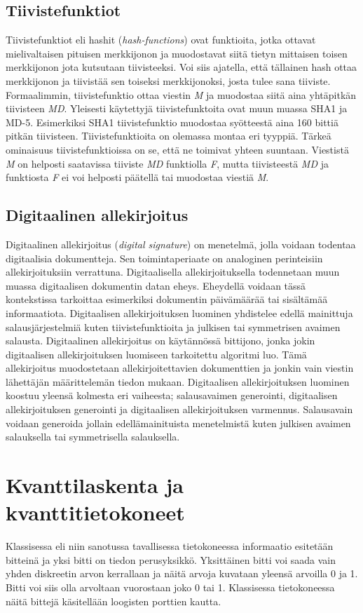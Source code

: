  \subsection{Tiivistefunktiot}
 Tiivistefunktiot eli hashit (\emph{hash-functions}) ovat funktioita, jotka ottavat mielivaltaisen pituisen merkkijonon ja muodostavat siitä tietyn mittaisen toisen merkkijonon jota kutsutaan tiivisteeksi. Voi siis ajatella, että tällainen hash ottaa merkkijonon ja tiivistää sen toiseksi merkkijonoksi, josta tulee sana tiiviste. Formaalimmin, tiivistefunktio ottaa viestin \emph{M} ja muodostaa siitä aina yhtäpitkän tiivisteen \emph{MD}. Yleisesti käytettyjä tiivistefunktoita ovat muun muassa SHA1 ja MD-5. Esimerkiksi SHA1 tiivistefunktio muodostaa syötteestä aina 160 bittiä pitkän tiivisteen. Tiivistefunktioita on olemassa montaa eri tyyppiä. Tärkeä ominaisuus tiivistefunktioissa on se, että ne toimivat yhteen suuntaan. Viestistä \emph{M} on helposti saatavissa tiiviste \emph{MD} funktiolla \emph{F}, mutta tiivisteestä \emph{MD} ja funktiosta \emph{F} ei voi helposti päätellä tai muodostaa viestiä \emph{M}.
 
 \subsection{Digitaalinen allekirjoitus}
 Digitaalinen allekirjoitus (\emph{digital signature}) on menetelmä, jolla voidaan todentaa digitaalisia dokumentteja. Sen toimintaperiaate on analoginen perinteisiin allekirjoituksiin verrattuna. Digitaalisella allekirjoituksella todennetaan muun muassa digitaalisen dokumentin datan eheys. Eheydellä voidaan tässä kontekstissa tarkoittaa esimerkiksi dokumentin päivämäärää tai sisältämää informaatiota. Digitaalisen allekirjoituksen luominen yhdistelee edellä mainittuja salausjärjestelmiä kuten tiivistefunktioita ja julkisen tai symmetrisen avaimen salausta. Digitaalinen allekirjoitus on käytännössä bittijono, jonka jokin digitaalisen allekirjoituksen luomiseen tarkoitettu algoritmi luo. Tämä allekirjoitus muodostetaan allekirjoitettavien dokumenttien ja jonkin vain viestin lähettäjän määrittelemän tiedon mukaan. Digitaalisen allekirjoituksen luominen koostuu yleensä kolmesta eri vaiheesta; salausavaimen generointi, digitaalisen allekirjoituksen generointi ja digitaalisen allekirjoituksen varmennus. Salausavain voidaan generoida jollain edellämainituista menetelmistä kuten julkisen avaimen salauksella tai symmetrisella salauksella.

\section{Kvanttilaskenta ja kvanttitietokoneet}
Klassisessa eli niin sanotussa tavallisessa tietokoneessa informaatio esitetään bitteinä ja yksi bitti on tiedon perusyksikkö. Yksittäinen bitti voi saada vain yhden diskreetin arvon kerrallaan ja näitä arvoja kuvataan yleensä arvoilla 0 ja 1. Bitti voi siis olla arvoltaan vuorostaan joko 0 tai 1. Klassisessa tietokoneessa näitä bittejä käsitellään loogisten porttien kautta.

